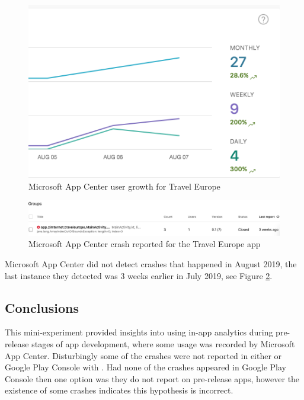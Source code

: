 \begin{figure}
    \centering
    \includegraphics[width=\linewidth]{images/microsoft-app-center/AppCenter_snippet_growth_for_test_app_2019_Aug_07.png}
    \caption{Microsoft App Center user growth for Travel Europe}
    \label{fig:appcenter_user_growth}
\end{figure}

\begin{figure}[htbp]
    \centering
    \includegraphics[width=\linewidth]{images/microsoft-app-center/AppCenter_crash_reported_in_test_app_2019_aug_07.png}
    \caption{Microsoft App Center crash reported for the Travel Europe app}
    \label{fig:appcenter_crash_report}
\end{figure}

Microsoft App Center did not detect crashes that happened in August 2019, the last instance they detected was 3 weeks earlier in July 2019, see Figure \ref{fig:appcenter_crash_report}.

\subsection{Conclusions}
This mini-experiment provided insights into using in-app analytics during pre-release stages of app development, where some usage was recorded by Microsoft App Center. Disturbingly some of the crashes were not reported in either  or Google Play Console with . Had none of the crashes appeared in Google Play Console then one option was they do not report on pre-release apps, however the existence of some crashes indicates this hypothesis is incorrect.